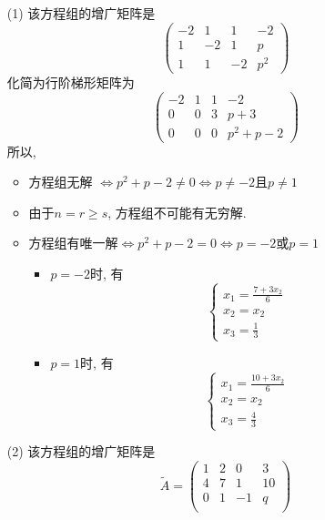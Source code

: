 \documentclass{article}
\begin{document}
\begin{itemize}
    \item[(1)]
    该方程组的增广矩阵是
    $$
    \begin{pmatrix}
        -2 & 1 & 1 & -2 \\
        1 & -2 & 1 & p \\
        1 & 1 & -2 & p^2
    \end{pmatrix}
    $$
    化简为行阶梯形矩阵为
    $$
    \begin{pmatrix}
        -2 & 1 & 1 & -2 \\
        0 & 0 & 3 & p + 3 \\
        0 & 0 & 0 & p^2 + p - 2
    \end{pmatrix}
    $$
    所以,
    \begin{itemize}
        \item 方程组无解 $\Leftrightarrow p^2 + p - 2 \neq 0 \Leftrightarrow p \neq -2 \text{且} p \neq 1$
        \item 由于$ n = r \geqslant s$, 方程组不可能有无穷解.
        \item 方程组有唯一解$\Leftrightarrow p^2 + p - 2 = 0 \Leftrightarrow p = -2 \text{或} p = 1$
            \begin{itemize}
                \item $p = -2$时, 有
                $$\begin{cases}
                    x_1 = \frac{7 + 3x_2}{6} \\
                    x_2 = x_2 \\
                    x_3 = \frac{1}{3}
                \end{cases}
                $$
                \item $p = 1$时, 有
                $$
                \begin{cases}
                    x_1 = \frac{10 + 3x_2}{6} \\
                    x_2 = x_2 \\
                    x_3 = \frac{4}{3}
                \end{cases}
                $$
            \end{itemize}
    \end{itemize}
    \item[(2)]
    该方程组的增广矩阵是
    $$
    \tilde{A} = \begin{pmatrix}
        1 & 2 & 0 & 3 \\
        4 & 7 & 1 & 10 \\
        0 & 1 & -1 & q \\

\end{pmatrix}$$
\end{itemize}
\end{document}

